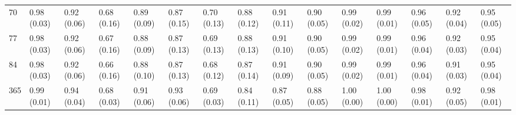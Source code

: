 \begin{tabular}{lllllllllllllll}
70  &  0.98 (0.03) &  0.92 (0.06) &  0.68 (0.16) &  0.89 (0.09) &  0.87 (0.15) &  0.70 (0.13) &  0.88 (0.12) &  0.91 (0.11) &  0.90 (0.05) &  0.99 (0.02) &  0.99 (0.01) &  0.96 (0.05) &  0.92 (0.04) &  0.95 (0.05) \\
77  &  0.98 (0.03) &  0.92 (0.06) &  0.67 (0.16) &  0.88 (0.09) &  0.87 (0.13) &  0.69 (0.13) &  0.88 (0.13) &  0.91 (0.10) &  0.90 (0.05) &  0.99 (0.02) &  0.99 (0.01) &  0.96 (0.04) &  0.92 (0.03) &  0.95 (0.04) \\
84  &  0.98 (0.03) &  0.92 (0.06) &  0.66 (0.16) &  0.88 (0.10) &  0.87 (0.13) &  0.68 (0.12) &  0.87 (0.14) &  0.91 (0.09) &  0.90 (0.05) &  0.99 (0.02) &  0.99 (0.01) &  0.96 (0.04) &  0.91 (0.03) &  0.95 (0.04) \\
365 &  0.99 (0.01) &  0.94 (0.04) &  0.68 (0.03) &  0.91 (0.06) &  0.93 (0.06) &  0.69 (0.03) &  0.84 (0.11) &  0.87 (0.05) &  0.88 (0.05) &  1.00 (0.00) &  1.00 (0.00) &  0.98 (0.01) &  0.92 (0.05) &  0.98 (0.01) \\
\bottomrule
\end{tabular}
